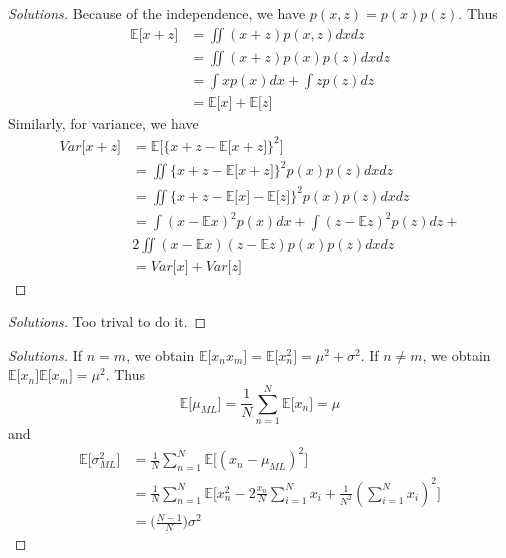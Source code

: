 \documentclass[12pt, a4paper]{article}
\newcommand{\E}{\mathbb{E}}
\newenvironment{exercise}[2][Ex]{\begin{trivlist}
\item[\hskip \labelsep {\bfseries #1}\hskip \labelsep {\bfseries #2.}]}{\end{trivlist}}
\begin{document}
\begin{exercise}{1.10(*)}
    \begin{proof}[Solutions]
        Because of the independence, we have $p(x,z)=p(x)p(z)$. Thus
        \begin{align*}
            \E\lbrack x+z\rbrack&=\iint(x+z)p(x,z)dxdz\\
            &=\iint(x+z)p(x)p(z)dxdz\\
            &=\int xp(x)dx+\int zp(z)dz\\
            &=\E\lbrack x\rbrack+\E\lbrack z\rbrack
        \end{align*}
        Similarly, for variance, we have
        \begin{align*}
            Var\lbrack x+z\rbrack&=\E\lbrack \{x+z-\E\lbrack x+z\rbrack\}^2\rbrack\\
            &=\iint\{x+z-\E\lbrack x+z\rbrack\}^2p(x)p(z)dxdz\\
            &=\iint\{x+z-\E\lbrack x\rbrack-\E\lbrack z\rbrack\}^2p(x)p(z)dxdz\\
            &=\int(x-\E x)^2p(x)dx+\int(z-\E z)^2p(z)dz+\\
            &2\iint(x-\E x)(z-\E z)p(x)p(z)dxdz\\
            &=Var\lbrack x\rbrack+Var\lbrack z\rbrack
        \end{align*}
    \end{proof}
\end{exercise}
\begin{exercise}{1.11(*)}
    \begin{proof}[Solutions]
        Too trival to do it.
    \end{proof}
\end{exercise}
\begin{exercise}{1.12(**)}
    \begin{proof}[Solutions]
        If $n=m$, we obtain $\E\lbrack x_nx_m\rbrack=\E\lbrack x_n^2\rbrack=\mu^2+\sigma^2$.
        If $n\neq m$, we obtain $\E\lbrack x_n\rbrack\E\lbrack x_m\rbrack=\mu^2$.
        Thus
        \begin{equation}
            \E\lbrack \mu_{ML}\rbrack=\frac{1}{N}\sum_{n=1}^{N}\E\lbrack x_n\rbrack=\mu
        \end{equation}
        and
        \begin{align}
            \E\lbrack \sigma^2_{ML}\rbrack&=\frac{1}{N}\sum_{n=1}^N\E\lbrack(x_n-\mu_{ML})^2
            \rbrack\nonumber\\
            &=\frac{1}{N}\sum_{n=1}^N\E\lbrack x_n^2-2\frac{x_n}{N}\sum_{i=1}^{N}x_i+
            \frac{1}{N^2}(\sum_{i=1}^Nx_i)^2\rbrack\nonumber\\
            &=\Big(\frac{N-1}{N}\Big)\sigma^2
        \end{align}
    \end{proof}
\end{exercise}
\end{document}
